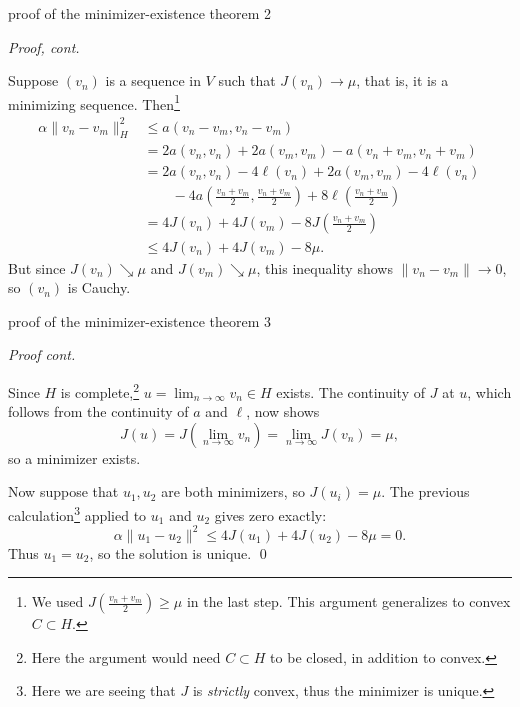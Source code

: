 \documentclass[10pt,
               svgnames,
               hyperref={colorlinks,
                         citecolor=DeepPink4,
                         linkcolor=FireBrick,
                         urlcolor=blue},
               usepdftitle=false]{beamer}
\begin{document}
\begin{frame}{proof of the minimizer-existence theorem 2}

\emph{Proof, cont.}

\medskip
Suppose $(v_n)$ is a sequence in $V$ such that $J(v_n) \to \mu$, that is, it is a minimizing sequence.  Then\footnote{We used $J\left(\frac{v_n+v_m}{2}\right)\ge \mu$ in the last step.  This argument generalizes to convex $C\subset H$.}
\begin{align*}
\alpha \|v_n-v_m\|_H^2 &\le a(v_n-v_m,v_n-v_m) \\
    &= 2 a(v_n,v_n) + 2 a(v_m,v_m) - a(v_n+v_m,v_n+v_m) \phantom{\Big|} \\
    &= 2 a(v_n,v_n) - 4\ell(v_n) + 2 a(v_m,v_m) - 4\ell(v_n) \\
    &\qquad - 4 a\left(\frac{v_n+v_m}{2},\frac{v_n+v_m}{2}\right) + 8\ell\left(\frac{v_n+v_m}{2}\right) \\
    &= 4 J(v_n) + 4 J(v_m) - 8 J\left(\frac{v_n+v_m}{2}\right) \\
    &\le 4 J(v_n) + 4 J(v_m) - 8 \mu.
\end{align*}
But since $J(v_n) \searrow \mu$ and $J(v_m) \searrow \mu$, this inequality shows $\|v_n - v_m\|\to 0$, so $(v_n)$ is Cauchy.
\end{frame}


\begin{frame}{proof of the minimizer-existence theorem 3}

\emph{Proof cont.}

\medskip
Since $H$ is complete,\footnote{Here the argument would need $C\subset H$ to be closed, in addition to convex.} $u=\lim_{n\to\infty} v_n \in H$ exists.  The continuity of $J$ at $u$, which follows from the continuity of $a$ and $\ell$, now shows
	$$J(u) = J\left(\lim_{n\to\infty} v_n\right) = \lim_{n\to\infty} J(v_n) = \mu,$$
so a minimizer exists.

\medskip
Now suppose that $u_1,u_2$ are both minimizers, so $J(u_i)=\mu$.  The previous calculation\footnote{Here we are seeing that $J$ is \emph{strictly} convex, thus the minimizer is unique.} applied to $u_1$ and $u_2$ gives zero exactly:
    $$\alpha \|u_1-u_2\|^2 \le 4 J(u_1) + 4 J(u_2) - 8 \mu = 0.$$
Thus $u_1=u_2$, so the solution is unique. \hfill \qed
\end{frame}
\end{document}
